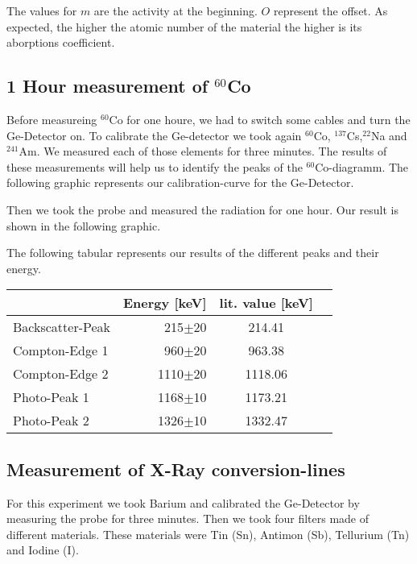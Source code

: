 The values for $m$ are the activity at the beginning. $O$ represent the offset. As expected, the higher the atomic number of the material the higher is its aborptions coefficient.

\newpage
\subsection{1 Hour measurement of $^{60}$Co}
Before measureing $^{60}$Co for one houre, we had to switch some cables and turn the Ge-Detector on. To calibrate the Ge-detector we took again $^{60}$Co, $^{137}$Cs,$^{22}$Na and $^{241}$Am. We measured each of those elements for three minutes. The results of these measurements will help us to identify the peaks of the $^{60}$Co-diagramm. The following graphic represents our calibration-curve for the Ge-Detector.



Then we took the probe and measured the radiation for one hour. Our result is shown in the following graphic.


The following tabular represents our results of the different peaks and their energy.
\\

\begin{tabular}{l|r|c|l}
& Energy [keV] & lit. value [keV] & \\
\hline
Backscatter-Peak & 215$\pm$20& 214.41	\\
Compton-Edge 1 & 960$\pm$20 & 963.38 	\\
Compton-Edge 2 & 1110$\pm$20 & 1118.06 	\\
Photo-Peak 1 & 1168$\pm$10 & 1173.21 	\\
Photo-Peak 2 & 1326$\pm$10 & 1332.47 	\\
\end{tabular}

\subsection{Measurement of X-Ray conversion-lines}
For this experiment we took Barium and calibrated the Ge-Detector by measuring the probe for three minutes. Then we took four filters made of different materials. These materials were Tin (Sn), Antimon (Sb),  Tellurium (Tn) and Iodine (I).
